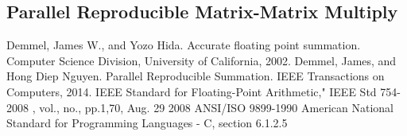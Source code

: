 \documentclass[12pt]{article}
\theoremstyle{plain}
\begin{document}
  \subsection{Parallel Reproducible Matrix-Matrix Multiply}
\begin{thebibliography}{9}
    Demmel, James W., and Yozo Hida. Accurate floating point summation. Computer Science Division, University of California, 2002.
    Demmel, James, and Hong Diep Nguyen. Parallel Reproducible Summation. IEEE Transactions on Computers, 2014.
    IEEE Standard for Floating-Point Arithmetic," IEEE Std 754-2008 , vol., no., pp.1,70, Aug. 29 2008
    ANSI/ISO 9899-1990 American National Standard for Programming Languages - C, section 6.1.2.5
\end{thebibliography}
\end{document}

